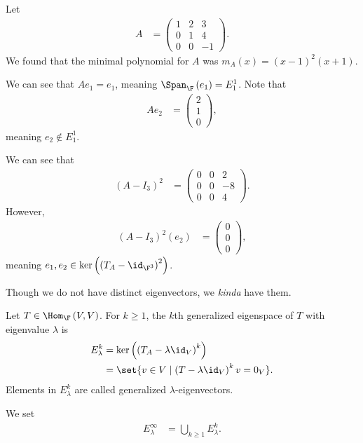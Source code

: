 \documentclass[10pt]{mypackage}
\begin{document}
\begin{example}
  Let
  \begin{align*}
    A &= \begin{pmatrix}1 & 2 & 3 \\ 0 & 1 & 4 \\ 0 & 0 & -1\end{pmatrix}.
  \end{align*}
  We found that the minimal polynomial for $A$ was $m_A(x) = \left(x-1\right)^2 \left(x+1\right)$.\newline

  We can see that $Ae_{1} = e_1$, meaning $\Span_{\F}\left(e_1\right) = E_{1}^{1}$. Note that
  \begin{align*}
    Ae_2 &= \begin{pmatrix}2\\1\\0\end{pmatrix},
  \end{align*}
  meaning $e_2 \notin E_{1}^{1}$.\newline

  We can see that
  \begin{align*}
    \left(A-I_{3}\right)^{2} &= \begin{pmatrix}0 & 0 & 2 \\ 0 & 0 & -8 \\ 0 & 0 & 4\end{pmatrix}.
  \end{align*}
  However,
  \begin{align*}
    \left(A-I_{3}\right)^2\left(e_2\right) &= \begin{pmatrix}0\\0\\0\end{pmatrix},
  \end{align*}
  meaning $e_1,e_2\in \ker\left(\left(T_A - \id_{\F^3}\right)^2\right)$.\newline

  Though we do not have distinct eigenvectors, we \textit{kinda} have them.
\end{example}
\begin{definition}
  Let $T\in \Hom_{\F}\left(V,V\right)$. For $k\geq 1$, the $k$th generalized eigenspace of $T$ with eigenvalue $\lambda$ is
  \begin{align*}
    E_{\lambda}^{k} &= \ker\left(\left(T_A - \lambda\id_{V}\right)^{k}\right)\\
                    &= \set{v\in V \mid \left(T-\lambda \id_{V}\right)^{k}v = 0_V}.
  \end{align*}
  Elements in $E_{\lambda}^{k}$ are called generalized $\lambda$-eigenvectors.\newline

  We set
  \begin{align*}
    E_{\lambda}^{\infty} &= \bigcup_{k\geq 1}E_{\lambda}^{k}.
  \end{align*}
\end{definition}
\end{document}
